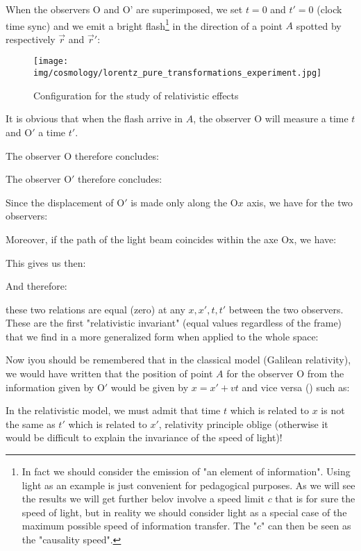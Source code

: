 		When the observers $\text{O}$ and $\text{O'}$ are superimposed, we set $t = 0$ and $t' = 0$ (clock time sync) and we emit a bright flash\footnote{In fact we should consider the emission of "an element of information". Using light as an example is just convenient for pedagogical purposes. As we will see the results we will get further belov involve a speed limit $c$ that is for sure the speed of light, but in reality we should consider light as a special case of the maximum possible speed of information transfer. The "$c$" can then be seen as the "causality speed".} in the direction of a point $A$ spotted by respectively $\vec{r}$ and $\vec{r}'$:
		\begin{figure}[H]
			\begin{center}
			\texttt{[image: img/cosmology/lorentz\_pure\_transformations\_experiment.jpg]}
			\end{center}	
			\caption{Configuration for the study of relativistic effects}
		\end{figure}
		It is obvious that when the flash arrive in $A$, the observer $\text{O}$ will measure a time $t$ and $\text{O}'$ a time $t'$.
		
		The observer $\text{O}$ therefore concludes:
		
		The observer $\text{O}'$ therefore concludes:
		
		Since the displacement of $\text{O}'$ is made only along the $\text{O}x$ axis, we have for the two observers:
		
		Moreover, if the path of the light beam coincides within the axe $\text{Ox}$, we have:
		
		This gives us then:
		
		And therefore:
		
		these two relations are equal (zero) at any $x, x', t, t'$ between the two observers. These are the first "relativistic invariant" (equal values regardless of the frame) that we find in a more generalized form when applied to the whole space:
		
		Now iyou should be remembered that in the classical model (Galilean relativity), we would have written that the position of point $A$ for the observer $\text{O}$ from the information given by $\text{O}'$ would be given by $x=x'+vt$ and vice versa () such as:
		
		In the relativistic model, we must admit that time $t$ which is related to $x$ is not the same as $t'$ which is related to $x'$, relativity principle oblige (otherwise it would be difficult to explain the invariance of the speed of light)!
		
